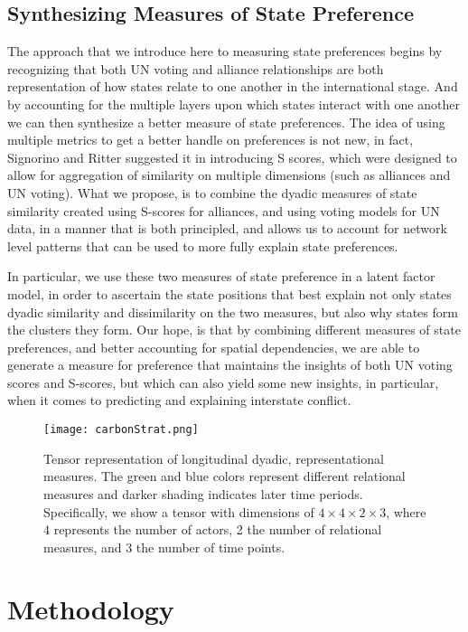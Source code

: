 \subsection*{Synthesizing Measures of State Preference}

The approach that we introduce here to measuring state preferences begins by recognizing that both UN voting and alliance relationships are both representation of how states relate to one another in the international stage. And by accounting for the multiple layers upon which states interact with one another we can then synthesize a better measure of state preferences.  The idea of using multiple metrics to get a better handle on preferences is not new, in fact, Signorino and Ritter suggested it in introducing S scores, which were designed to allow for aggregation of similarity on multiple dimensions (such as alliances and UN voting). What we propose, is to combine the dyadic measures of state similarity created using S-scores for alliances, and using voting models for UN data, in a manner that is both principled, and allows us to account for network level patterns that can be used to more fully explain state preferences. 

In particular, we use these two measures of state preference in a latent factor model, in order to ascertain the state positions that best explain not only states dyadic similarity and dissimilarity on the two measures, but also why states form the clusters they form. Our hope, is that by combining different measures of state preferences, and better accounting for spatial dependencies, we are able to generate a measure for preference that maintains the insights of both UN voting scores and S-scores, but which can also yield some new insights, in particular, when it comes to predicting and explaining interstate conflict.

\begin{figure}[ht]
	\centering
	\texttt{[image: carbonStrat.png]}
	\caption{Tensor representation of longitudinal dyadic, representational measures. The green and blue colors represent different relational measures and darker shading indicates later time periods. Specifically, we show a tensor with dimensions of $4 \times 4 \times 2 \times 3$, where 4 represents the number of actors, 2 the number of relational measures, and 3 the number of time points.}
	\label{fig:tensViz}
\end{figure}

\section*{Methodology}

